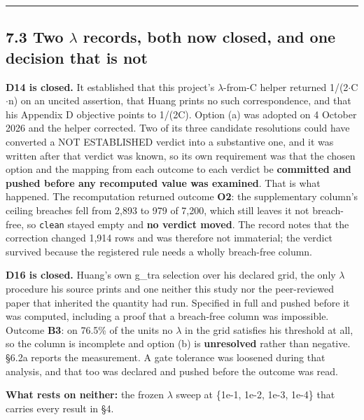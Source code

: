 \documentclass[
  10pt,
]{article}
\begin{document}
\begin{center}\rule{0.5\linewidth}{0.5pt}\end{center}

\subsection{\texorpdfstring{7.3 Two \(\lambda\) records, both now
closed, and one decision that is
not}{7.3 Two \textbackslash lambda records, both now closed, and one decision that is not}}\label{two-lambda-records-both-now-closed-and-one-decision-that-is-not}

\textbf{D14 is closed.} It established that this project's
\(\lambda\)-from-C helper returned 1/(2\(\cdot\)C\(\cdot\)n) on an
uncited assertion, that Huang prints no such correspondence, and that
his Appendix D objective points to 1/(2C). Option (a) was adopted on 4
October 2026 and the helper corrected. Two of its three candidate
resolutions could have converted a NOT ESTABLISHED verdict into a
substantive one, and it was written after that verdict was known, so its
own requirement was that the chosen option and the mapping from each
outcome to each verdict be \textbf{committed and pushed before any
recomputed value was examined}. That is what happened. The recomputation
returned outcome \textbf{O2}: the supplementary column's ceiling
breaches fell from 2,893 to 979 of 7,200, which still leaves it not
breach-free, so \texttt{clean} stayed empty and \textbf{no verdict
moved}. The record notes that the correction changed 1,914 rows and was
therefore not immaterial; the verdict survived because the registered
rule needs a wholly breach-free column.

\textbf{D16 is closed.} Huang's own g\_tra selection over his declared
grid, the only \(\lambda\) procedure his source prints and one neither
this study nor the peer-reviewed paper that inherited the quantity had
run. Specified in full and pushed before it was computed, including a
proof that a breach-free column was impossible. Outcome \textbf{B3}: on
76.5\% of the units no \(\lambda\) in the grid satisfies his threshold
at all, so the column is incomplete and option (b) is
\textbf{unresolved} rather than negative. \S{}6.2a reports the
measurement. A gate tolerance was loosened during that analysis, and
that too was declared and pushed before the outcome was read.

\textbf{What rests on neither:} the frozen \(\lambda\) sweep at \{1e-1,
1e-2, 1e-3, 1e-4\} that carries every result in \S{}4.
\end{document}
